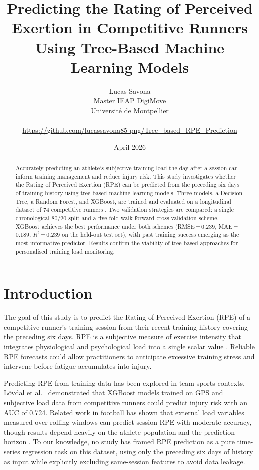 \documentclass[10pt, twocolumn]{article}
\title{Predicting the Rating of Perceived Exertion in Competitive
       Runners Using Tree-Based Machine Learning Models}
\author{Lucas Savona\\
        \small Master IEAP DigiMove\\
        \small Universit\'{e} de Montpellier\\\\
        \small \url{https://github.com/lucassavona85-png/Tree_based_RPE_Prediction}}
\date{April 2026}
\begin{document}
\maketitle

\begin{abstract}
Accurately predicting an athlete's subjective training load the day after
a session can inform training management and reduce injury risk. This study
investigates whether the Rating of Perceived Exertion (RPE) can be predicted
from the preceding six days of training history using tree-based machine
learning models. Three models, a Decision Tree, a Random Forest, and
XGBoost, are trained and evaluated on a longitudinal dataset of 74
competitive runners \citep{lovdal2021}. Two validation strategies are
compared: a single chronological 80/20 split and a five-fold walk-forward
cross-validation scheme. XGBoost achieves the best performance under both
schemes (RMSE\,=\,0.239, MAE\,=\,0.189, $R^2$\,=\,0.239 on the held-out
test set), with past training success emerging as the most informative
predictor. Results confirm the viability of tree-based approaches for
personalised training load monitoring.
\end{abstract}

\section{Introduction}
\label{sec:intro}

The goal of this study is to predict the Rating of Perceived
Exertion (RPE) of a competitive runner's training session from their
recent training history covering the preceding six days. RPE is a
subjective measure of exercise intensity that integrates physiological
and psychological load into a single scalar value \citep{borg1982, foster2001}.
Reliable RPE forecasts could allow practitioners to anticipate excessive
training stress and intervene before fatigue accumulates into injury.

Predicting RPE from training data has been explored in team sports
contexts. L{\"o}vdal et al.~\cite{lovdal2021} demonstrated that XGBoost models trained
on GPS and subjective load data from competitive runners could predict
injury risk with an AUC of 0.724. Related work in football has shown
that external load variables measured over rolling windows can predict
session RPE with moderate accuracy, though results depend heavily on
the athlete population and the prediction horizon \citep{vallance2023}.
To our knowledge, no study has framed RPE prediction as a pure
time-series regression task on this dataset, using only the preceding
six days of history as input while explicitly excluding same-session
features to avoid data leakage.
\end{document}
